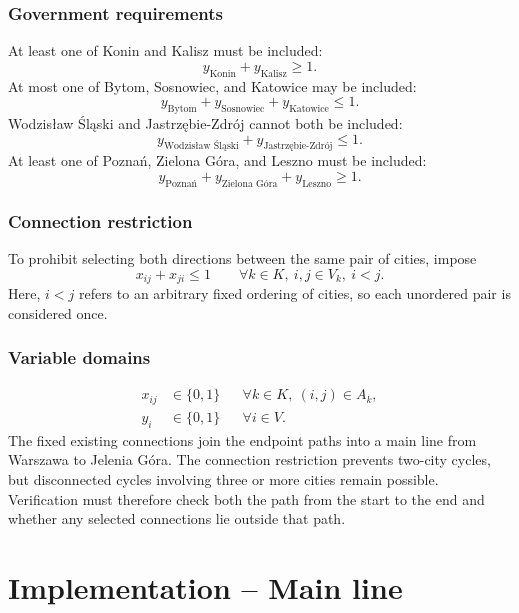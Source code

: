 \documentclass[11pt,a4paper]{article}
\begin{document}
\subsubsection{Government requirements}
At least one of Konin and Kalisz must be included:
\begin{equation}
y_{\text{Konin}}+y_{\text{Kalisz}}\ge1.
\end{equation}
At most one of Bytom, Sosnowiec, and Katowice may be included:
\begin{equation}
y_{\text{Bytom}}+y_{\text{Sosnowiec}}+y_{\text{Katowice}}\le1.
\end{equation}
Wodzisław Śląski and Jastrzębie-Zdrój cannot both be included:
\begin{equation}
y_{\text{Wodzisław Śląski}}+y_{\text{Jastrzębie-Zdrój}}\le1.
\end{equation}
At least one of Poznań, Zielona Góra, and Leszno must be included:
\begin{equation}
y_{\text{Poznań}}+y_{\text{Zielona Góra}}+y_{\text{Leszno}}\ge1.
\end{equation}

\subsubsection{Connection restriction}
To prohibit selecting both directions between the same pair of cities, impose
\begin{equation}
x_{ij}+x_{ji}\le1
\qquad\forall k\in K,\ i,j\in V_k,\ i<j.
\end{equation}
Here, $i<j$ refers to an arbitrary fixed ordering of cities, so each unordered pair is considered once.

\subsubsection{Variable domains}
\begin{align}
x_{ij}&\in\{0,1\} &&\forall k\in K,\ (i,j)\in A_k,\\
y_i&\in\{0,1\} &&\forall i\in V.
\end{align}
The fixed existing connections join the endpoint paths into a main line from Warszawa to Jelenia Góra. The connection restriction prevents two-city cycles, but disconnected cycles involving three or more cities remain possible. Verification must therefore check both the path from the start to the end and whether any selected connections lie outside that path.

\section{Implementation -- Main line}
\end{document}
